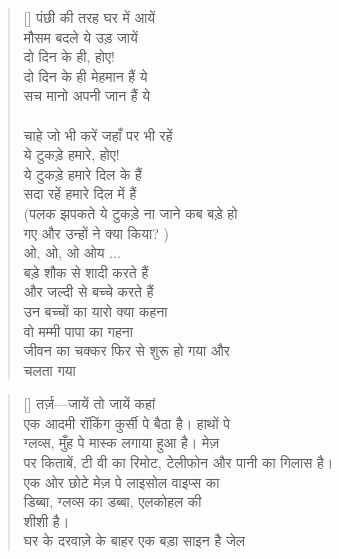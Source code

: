 \begin{verse}[\versewidth]
{पंछी की तरह घर में आयें\\
मौसम बदले ये उड़ जायें\\
दो दिन के ही, होए!\\
दो दिन के ही मेहमान हैं ये\\
सच मानो अपनी जान हैं ये\\
\\
चाहे जो भी करें जहाँ पर भी रहें\\
ये टुकड़े हमारे, होए!\\
ये टुकड़े हमारे दिल के हैं\\
सदा रहें हमारे दिल में हैं\\
(पलक झपकते ये टुकड़े ना जाने कब बड़े हो\\
गए और उन्हों ने क्या किया?
)\\
ओ, ओ, ओ ओय ... \\
बड़े शौक से शादी करते हैं\\
और जल्दी से बच्चे करते हैं\\
उन बच्चों का यारो क्या कहना\\
वो मम्मी पापा का गहना\\
जीवन का चक्कर फिर से शुरू हो गया और\\
चलता गया
}\end{verse}

\begin{verse}[\versewidth]\texthindi{
तर्ज़—जायें तो जायें कहां\\
एक आदमी रॉकिंग कुर्सी पे बैठा है। हाथों पे\\
ग्लव्स, मुँह पे मास्क लगाया हुआ है। मेज़\\
पर किताबें, टी वी का रिमोट, टेलीफोन और पानी का गिलास है।\\
एक ओर छोटे मेज़ पे लाइसोल वाइप्स का\\
डिब्बा, ग्लव्स का डब्बा, एलकोहल की\\
शीशी है।\\
घर के दरवाज़े के बाहर एक बड़ा साइन है जेल
}\end{verse}

